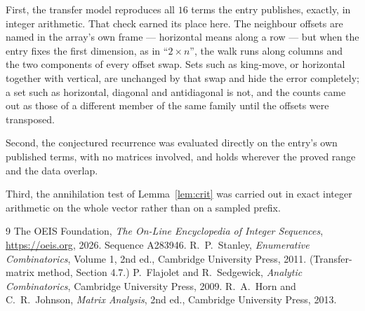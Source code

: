 \documentclass[11pt,a4paper]{article}
\theoremstyle{plain}
\theoremstyle{definition}
\begin{document}
First, the transfer model reproduces all $16$ terms the entry publishes, exactly, in
integer arithmetic. That check earned its place here. The neighbour offsets are named in the
array's own frame --- horizontal means along a row --- but when the entry fixes the first
dimension, as in ``$2\times n$'', the walk runs along columns and the two components of every
offset swap. Sets such as king-move, or horizontal together with vertical, are unchanged by
that swap and hide the error completely; a set such as horizontal, diagonal and antidiagonal
is not, and the counts came out as those of a different member of the same family until the
offsets were transposed.

Second, the conjectured recurrence was evaluated directly on the entry's own published terms,
with no matrices involved, and holds wherever the proved range and the data overlap.

Third, the annihilation test of Lemma~\ref{lem:crit} was carried out in exact integer
arithmetic on the whole vector rather than on a sampled prefix.

\begin{thebibliography}{9}
 The OEIS Foundation, \emph{The On-Line Encyclopedia of Integer
Sequences}, \url{https://oeis.org}, 2026. Sequence A283946.
 R.~P.~Stanley, \emph{Enumerative Combinatorics}, Volume 1, 2nd ed.,
Cambridge University Press, 2011. (Transfer-matrix method, Section 4.7.)
 P.~Flajolet and R.~Sedgewick, \emph{Analytic Combinatorics}, Cambridge
University Press, 2009.
 R.~A.~Horn and C.~R.~Johnson, \emph{Matrix Analysis}, 2nd ed., Cambridge
University Press, 2013.
\end{thebibliography}
\end{document}
